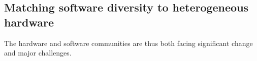 







\subsection{Matching software diversity to heterogeneous hardware}

The hardware and software communities are thus both
facing significant change and major challenges.





